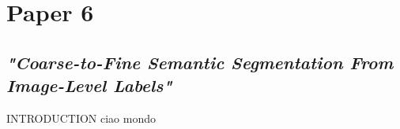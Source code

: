 \section{Paper 6}
\subsection{\emph{"Coarse-to-Fine Semantic Segmentation From Image-Level Labels"}}

\begin{frame}{INTRODUCTION}
    ciao mondo
\end{frame}